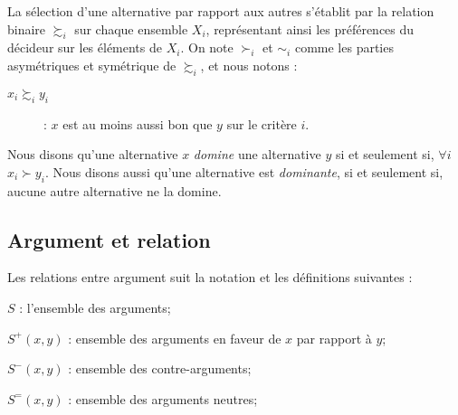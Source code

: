 \documentclass[a4paper, 11pt]{article}
\begin{document}
La sélection d'une alternative par rapport aux autres s’établit par la relation binaire $\succsim_i$ sur chaque ensemble $X_i$, représentant ainsi les préférences du décideur sur les éléments de $X_i$. On note $\succ_i$ et $\sim_i$ comme les parties asymétriques et symétrique de $\succsim_i$, et nous notons :\\
\begin{description}
\item [$x_i \succsim_i y_i$]  : $x$ est au moins aussi bon que $y$ sur le critère $i$.\\
\end{description}

Nous disons qu'une alternative $x$ \textit{domine} une alternative $y$ si et seulement si, $\forall i$ $x_i \succ y_i$.
Nous disons aussi qu'une alternative est \textit{dominante}, si et seulement si, aucune autre alternative ne la domine.

\subsection{Argument et relation}

Les relations entre argument suit la notation et les définitions suivantes \textcolor{blue}{\citep{DBLP}}:\\

\begin{description}
\item $S$ : l'ensemble des arguments;
\item $S^+(x,y)$ : ensemble des arguments en faveur de $x$ par rapport à $y$;
\item $S^-(x,y)$ : ensemble des contre-arguments;
\item $S^=(x,y)$ : ensemble des arguments neutres;\\
\end{description}

\begin{comment}
La relation de préférence $\succsim$ nous permet d'avoir une distinction de ces trois types d'argument, nous avons donc :\\

\begin{itemize}
\item $Arg^+(x,y) = \{i\in N, x_i \succ_i y_i\}$;
\item $Arg^=(x,y) = \{i\in N, x_i \sim_i y_i\}$;
\item $Arg^-(x,y) = \{i\in N, x_i \prec_i y_i\}$.\\
\end{itemize}
\end{comment}
\end{document}
